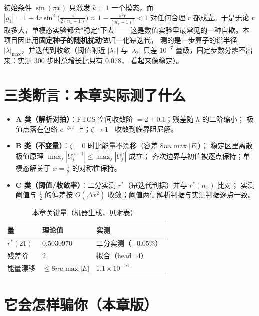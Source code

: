 \begin{remark}[用最低模态测稳定性是假阴性]
初始条件 $\sin(\pi x)$ 只激发 $k=1$ 一个模态，而
$|g_1|=1-4r\sin^2\!\bigl(\frac{\pi}{2(n_x-1)}\bigr)\approx1-\frac{\pi^2r}{(n_x-1)^2}<1$
对任何合理 $r$ 都成立。于是无论 $r$ 取多大，单模态实验都会"稳定"下去——
这是数值实验里最常见的一种自欺。本项目因此用\textbf{固定种子的随机扰动}做归一化幂迭代，
测的是一步算子的谱半径 $|\lambda|_{\max}$，并迭代到收敛（阈值附近 $|\lambda_1|$ 与
$|\lambda_2|$ 只差 $10^{-7}$ 量级，固定步数分辨不出来：实测 300 步时总增长比只有 $0.078$，
看起来像稳定）。
\end{remark}

\section{三类断言：本章实际测了什么}

\begin{itemize}
  \item \textbf{A 类（解析对拍）}：FTCS 空间收敛阶 $=2\pm0.1$；残差随 $h$ 的二阶缩小；
        极值点落在包络 $e^{-\zeta\omega t}$ 上；$\zeta\to1^-$ 收敛到临界阻尼解。
  \item \textbf{B 类（不变量）}：$\zeta=0$ 时比能量不漂移（容差 $8nu\max|E|$）；
        稳定区里离散极值原理 $\max_j|U_j^{n+1}|\le\max_j|U_j^n|$ 成立；
        齐次边界与初值被逐点保持；单模态解关于 $x=\tfrac12$ 的对称性保持。
  \item \textbf{C 类（阈值/收敛率）}：二分实测 $r^*$（幂迭代判据）并与 $r^*(n_x)$ 比对；
        实测阈值与 $\tfrac12$ 的偏差按 $O(\Delta x^2)$ 收敛；阈值两侧解析判据与实测判据逐点一致。
\end{itemize}

\begin{table}[htbp]
\centering
\caption{本章关键量（机器生成，见附表）}
\begin{tabular}{@{}lll@{}}
\toprule
量 & 理论值 & 实测 \\
\midrule
$r^*(21)$ & $0.5030970$ & 二分实测（$\pm 0.05\%$）\\
残差阶 & 2 & 拟合（head=4）\\
能量漂移 & $\le 8nu\max|E|$ & $1.1\times10^{-16}$ \\
\bottomrule
\end{tabular}
\end{table}



\section{它会怎样骗你（本章版）}

